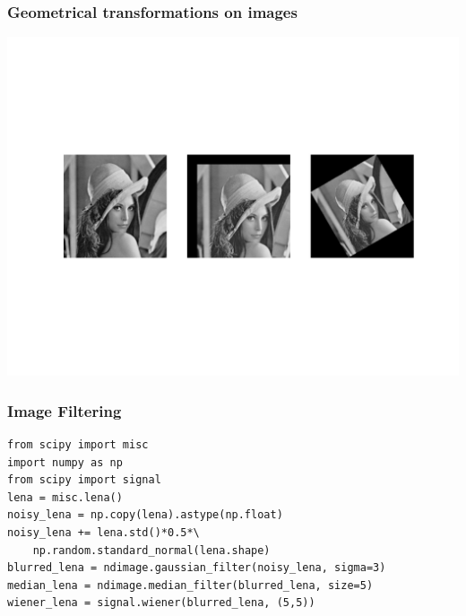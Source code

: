 \documentclass[10pt,colorlinks]{beamer}
\begin{document}
\begin{frame}[fragile]\frametitle{Geometrical transformations on images}
\includegraphics[width=\textwidth]{plwfigis/CursP_3_figure65}

\end{frame}

\begin{frame}[fragile]\frametitle{Image Filtering}
\begin{verbatim}
from scipy import misc
import numpy as np
from scipy import signal
lena = misc.lena()
noisy_lena = np.copy(lena).astype(np.float)
noisy_lena += lena.std()*0.5*\
    np.random.standard_normal(lena.shape)
blurred_lena = ndimage.gaussian_filter(noisy_lena, sigma=3)
median_lena = ndimage.median_filter(blurred_lena, size=5)
wiener_lena = signal.wiener(blurred_lena, (5,5))
\end{verbatim}


\end{frame}
\end{document}
